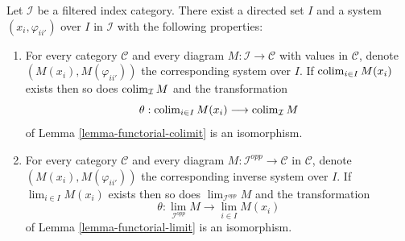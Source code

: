 \begin{lemma}
\label{lemma-directed-category-system}
Let $\mathcal{I}$ be a filtered index category.
There exist a directed set $I$
and a system $(x_i, \varphi_{ii'})$ over $I$ in $\mathcal{I}$
with the following properties:
\begin{enumerate}
\item For every category $\mathcal{C}$ and every diagram
$M : \mathcal{I} \to \mathcal{C}$ with values in $\mathcal{C}$,
denote $(M(x_i), M(\varphi_{ii'}))$
the corresponding system over $I$. If
$\mathop{\mathrm{colim}}\nolimits_{i \in I} M(x_i)$ exists then so does
$\mathop{\mathrm{colim}}\nolimits_\mathcal{I} M$ and the transformation
$$
\theta :
\mathop{\mathrm{colim}}\nolimits_{i \in I} M(x_i)
\longrightarrow
\mathop{\mathrm{colim}}\nolimits_\mathcal{I} M
$$
of Lemma \ref{lemma-functorial-colimit} is an isomorphism.
\item For every category $\mathcal{C}$ and every diagram
$M : \mathcal{I}^{opp} \to \mathcal{C}$ in $\mathcal{C}$, denote
$(M(x_i), M(\varphi_{ii'}))$ the corresponding inverse system
over $I$. If $\lim_{i \in I} M(x_i)$ exists then so does
$\lim_{\mathcal{I}^{opp}} M$ and the transformation
$$
\theta :
\lim_{\mathcal{I}^{opp}} M
\longrightarrow
\lim_{i \in I} M(x_i)
$$
of Lemma \ref{lemma-functorial-limit} is an isomorphism.
\end{enumerate}
\end{lemma}

